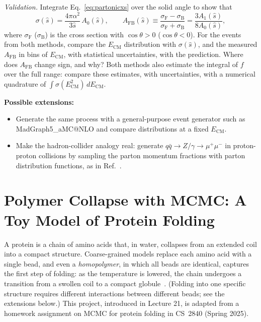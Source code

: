 \begin{problem}
  \emph{Validation.}
  Integrate Eq.~\eqref{eq:partonicxs} over the solid angle to show that
  \begin{equation}
    \sigma(\hat s) = \frac{4\pi\alpha^2}{3\hat s}\,A_0(\hat s), \qquad
    A_\mathrm{FB}(\hat s) \equiv \frac{\sigma_\mathrm{F} - \sigma_\mathrm{B}}{\sigma_\mathrm{F} + \sigma_\mathrm{B}} = \frac{3A_1(\hat s)}{8A_0(\hat s)},
  \end{equation}
  where $\sigma_\mathrm{F}$ ($\sigma_\mathrm{B}$) is the cross section with $\cos\theta > 0$ ($\cos\theta < 0$).
  For the events from both methods, compare the $E_\text{CM}$ distribution with $\sigma(\hat s)$, and the measured $A_\mathrm{FB}$ in bins of $E_\text{CM}$, with statistical uncertainties, with the prediction.
  Where does $A_\mathrm{FB}$ change sign, and why?
  Both methods also estimate the integral of $f$ over the full range: compare these estimates, with uncertainties, with a numerical quadrature of $\int \sigma(E_\text{CM}^2)\, dE_\text{CM}$.
\end{problem}

\noindent\textbf{Possible extensions:}
\begin{itemize}
  \item Generate the same process with a general-purpose event generator such as MadGraph5\_aMC@NLO and compare distributions at a fixed $E_\text{CM}$.
  \item Make the hadron-collider analogy real: generate $q\bar q \to Z/\gamma \to \mu^+\mu^-$ in proton-proton collisions by sampling the parton momentum fractions with parton distribution functions, as in Ref.~\cite{Papaefstathiou:2014mya}.
\end{itemize}

\newpage
\section{Polymer Collapse with MCMC: A Toy Model of Protein Folding}

A protein is a chain of amino acids that, in water, collapses from an extended coil into a compact structure.
Coarse-grained models replace each amino acid with a single bead, and even a \emph{homopolymer}, in which all beads are identical, captures the first step of folding: as the temperature is lowered, the chain undergoes a transition from a swollen coil to a compact globule~\cite{deGennes:1979}.
(Folding into one specific structure requires different interactions between different beads; see the extensions below.)
This project, introduced in Lecture 21, is adapted from a homework assignment on MCMC for protein folding in CS~2840 (Spring 2025).

